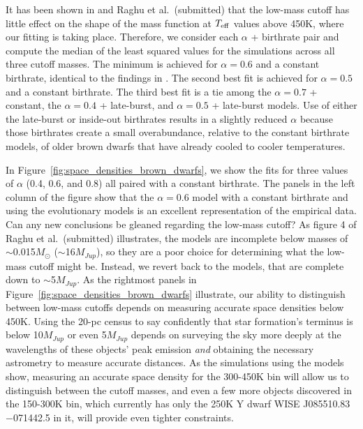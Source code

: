 \documentclass[twocolumn,tighten,twocolappendix]{aastex631}
\begin{document}
It has been shown in \cite{kirkpatrick2021} and Raghu et al.\ (submitted) that the low-mass cutoff has little effect on the shape of the mass function at $T_{\rm eff}$ values above 450K, where our fitting is taking place. Therefore, we consider each $\alpha$ + birthrate pair and compute the median of the least squared values for the simulations across all three cutoff masses. The minimum is achieved for $\alpha = 0.6$ and a constant birthrate, identical to the findings in \cite{kirkpatrick2021}. The second best fit is achieved for $\alpha = 0.5$ and a constant birthrate. The third best fit is a tie among the $\alpha = 0.7$ + constant, the $\alpha = 0.4$ + late-burst, and $\alpha = 0.5$ + late-burst models. Use of either the late-burst or inside-out birthrates results in a slightly reduced $\alpha$ because those birthrates create a small overabundance, relative to the constant birthrate models, of older brown dwarfs that have already cooled to cooler temperatures.

In Figure~\ref{fig:space_densities_brown_dwarfs}, we show the fits for three values of $\alpha$ (0.4, 0.6, and 0.8) all paired with a constant birthrate. The panels in the left column of the figure show that the $\alpha = 0.6$ model with a constant birthrate and using the \cite{saumon2008} evolutionary models is an excellent representation of the empirical data. Can any new conclusions be gleaned regarding the low-mass cutoff? As figure 4 of Raghu et al.\ (submitted) illustrates, the \cite{saumon2008} models are incomplete below masses of $\sim$0.015$M_\odot$ ($\sim$16$M_{Jup}$), so they are a poor choice for determining what the low-mass cutoff might be. Instead, we revert back to the \cite{baraffe2003} models, that are complete down to $\sim$5$M_{Jup}$. As the rightmost panels in Figure~\ref{fig:space_densities_brown_dwarfs} illustrate, our ability to distinguish between low-mass cutoffs depends on measuring accurate space densities below 450K. Using the 20-pc census to say confidently that star formation's terminus is below 10$M_{Jup}$ or even 5$M_{Jup}$ depends on surveying the sky more deeply at the wavelengths of these objects' peak emission {\it and} obtaining the necessary astrometry to measure accurate distances. As the simulations using the \cite{baraffe2003} models show, measuring an accurate space density for the 300-450K bin will allow us to distinguish between the cutoff masses, and even a few more objects discovered in the 150-300K bin, which currently has only the 250K Y dwarf WISE J085510.83$-$071442.5 in it, will provide even tighter constraints.
\end{document}
